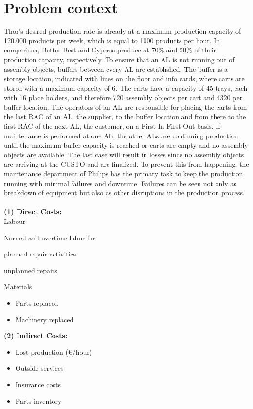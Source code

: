 \section{Problem context} \label{Problem Context}
Thor's desired production rate is already at a maximum production capacity of 120.000 products per week, which is equal to 1000 products per hour. In comparison, Better-Best and Cypress produce at 70\% and 50\% of their production capacity, respectively. To ensure that an AL is not running out of assembly objects, buffers between every AL are established. The buffer is a storage location, indicated with lines on the floor and info cards, where carts are stored with a maximum capacity of 6. The carts have a capacity of 45 trays, each with 16 place holders, and therefore 720 assembly objects per cart and 4320 per buffer location. The operators of an AL are responsible for placing the carts from the last RAC of an AL, the supplier, to the buffer location and from there to the first RAC of the next AL, the customer, on a First In First Out basis. If maintenance is performed at one AL, the other ALs are continuing  production until the maximum buffer capacity is reached or carts are empty and no assembly objects are available. The last case will result in losses since no assembly objects are arriving at the CUSTO and are finalized. To prevent this from happening, the maintenance department of Philips has the primary task to keep the production running with minimal failures and downtime. Failures can be seen not only as breakdown of equipment but also as other disruptions in the production process. \\
\\
\textbf{(1) Direct Costs:}\\
Labour
\begin{itemize}
\item Normal and overtime labor for
{\setlength\itemindent{15pt} \item planned repair activities}
{\setlength\itemindent{15pt} \item unplanned repairs}
\end{itemize}
Materials
\begin{itemize}
\item Parts replaced
\item Machinery replaced\\
\end{itemize}
\textbf{(2) Indirect Costs:}
\begin{itemize}
\item Lost production (€/hour)
\item Outside services
\item Insurance costs
\item Parts inventory
\end{itemize}
